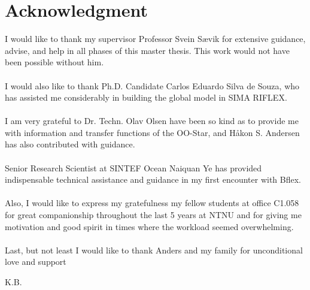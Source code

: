 \chapter*{Acknowledgment}
I would like to thank my supervisor Professor Svein Sævik for extensive guidance, advise, and help in all phases of this master thesis. This work would not have been possible without him. \\\\I would also like to thank Ph.D. Candidate Carlos Eduardo Silva de Souza, who has assisted me considerably in building the global model in SIMA RIFLEX. \\\\  I am very grateful to Dr. Techn. Olav Olsen have been so kind as to provide me with information and transfer functions of the OO-Star, and Håkon S. Andersen has also contributed with guidance. \\\\ Senior Research Scientist at SINTEF Ocean Naiquan Ye has provided indispensable technical assistance and guidance in my first encounter with Bflex. \\\\ Also, I would like to express my gratefulness my fellow students at office C1.058 for great companionship throughout the last 5 years at NTNU and for giving me motivation and good spirit in times where the workload seemed overwhelming. \\\\ Last, but not least I would like to thank Anders and my family for unconditional love and support


\newline
\newline
\newline

\begin{flushright}
K.B.
\end{flushright}